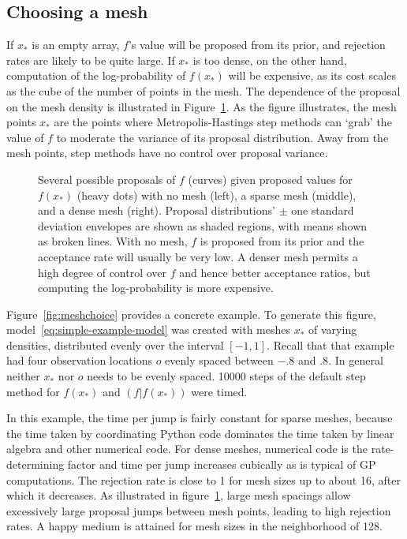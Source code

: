 \documentclass[article]{jss}
\begin{document}
\subsection{Choosing a mesh} 
\label{sec:mesh-choice} 
If $x_*$ is an empty array, $f$'s value will be proposed from its prior, and rejection rates are likely to be quite large. If $x_*$ is too dense, on the other hand, computation of the log-probability of $f(x_*)$ will be expensive, as its cost scales as the cube of the number of points in the mesh. The dependence of the proposal on the mesh density is illustrated in Figure~\ref{fig:meshpropose}. As the figure illustrates, the mesh points $x_*$ are the points where Metropolis-Hastings step methods can `grab' the value of $f$ to moderate the variance of its proposal distribution. Away from the mesh points, step methods have no control over proposal variance.

\begin{figure}
    \centering
    \caption{Several possible proposals of $f$ (curves) given proposed values for $f(x_*)$ (heavy dots) with no mesh (left), a sparse mesh (middle), and a dense mesh (right). Proposal distributions'  $\pm$ one standard deviation envelopes are shown as shaded regions, with means shown as broken lines. With no mesh, $f$ is proposed from its prior and the acceptance rate will usually be very low. A denser mesh permits a high degree of control over $f$ and hence better acceptance ratios, but computing the log-probability is more expensive.}
    \label{fig:meshpropose}
\end{figure}


Figure~\ref{fig:meshchoice} provides a concrete example. To generate this figure, model~\ref{eq:simple-example-model} was created with meshes $x_*$ of varying densities, distributed evenly over the interval $[-1,1]$. Recall that that example had four observation locations $o$ evenly spaced between $-.8$ and $.8$. In general neither $x_*$ nor $o$ needs to be evenly spaced. 10000 steps of the default step method for $f(x_*)$ and $(f|f(x_*))$ were timed. 

In this example, the time per jump is fairly constant for sparse meshes, because the time taken by coordinating Python code dominates the time taken by linear algebra and other numerical code. For dense meshes, numerical code is the rate-determining factor and time per jump increases cubically as is typical of GP computations. The rejection rate is close to 1 for mesh sizes up to about 16, after which it decreases. As illustrated in figure~\ref{fig:meshpropose}, large mesh spacings allow excessively large proposal jumps between mesh points, leading to high rejection rates. A happy medium is attained for mesh sizes in the neighborhood of 128.
\end{document}
